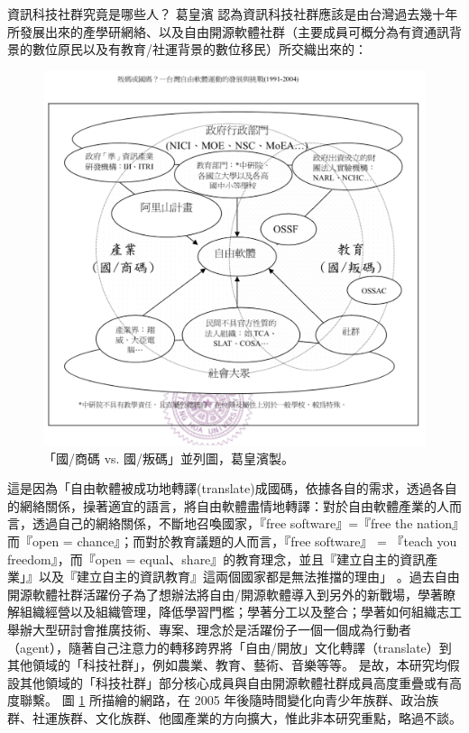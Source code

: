 \documentclass[12pt,a4paper]{article}
\begin{document}
資訊科技社群究竟是哪些人？ 葛皇濱 \citep{gen04} 認為資訊科技社群應該是由台灣過去幾十年所發展出來的產學研網絡、以及自由開源軟體社群（主要成員可概分為有資通訊背景的數位原民以及有教育/社運背景的數位移民）所交織出來的：
\begin{figure}[htbp]
\centering
\includegraphics[width=.9\linewidth]{./images/community_network.png}
\caption{\label{fig:info-community-net}
「國/商碼 vs. 國/叛碼」並列圖，葛皇濱製。}
\end{figure}

這是因為「自由軟體被成功地轉譯(translate)成國碼，依據各自的需求，透過各自的網絡關係，操著適宜的語言，將自由軟體盡情地轉譯：對於自由軟體產業的人而言，透過自己的網絡關係，不斷地召喚國家，『free software』=『free the nation』而『open = chance』；而對於教育議題的人而言，『free software』 = 『teach you freedom』，而『open = equal、share』的教育理念，並且『建立自主的資訊產業」』以及『建立自主的資訊教育』這兩個國家都是無法推擋的理由」\citep*{gen04} 。過去自由開源軟體社群活躍份子為了想辦法將自由/開源軟體導入到另外的新戰場，學著瞭解組織經營以及組織管理，降低學習門檻；學著分工以及整合；學著如何組織志工舉辦大型研討會推廣技術、專案、理念於是活躍份子一個一個成為行動者（agent），隨著自己注意力的轉移跨界將「自由/開放」文化轉譯（translate）到其他領域的「科技社群」，例如農業、教育、藝術、音樂等等。  是故，本研究均假設其他領域的「科技社群」部分核心成員與自由開源軟體社群成員高度重疊或有高度聯繫。 圖 \ref{fig:info-community-net} 所描繪的網路，在 2005 年後隨時間變化向青少年族群、政治族群、社運族群、文化族群、他國產業的方向擴大，惟此非本研究重點，略過不談。
\end{document}

